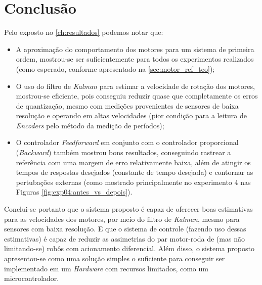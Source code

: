 \chapter[Conclusão]{Conclusão}
\label{ch:conclusao}


Pelo exposto no \autoref{ch:resultados} podemos notar que: 

\begin{itemize}
    \item A aproximação do comportamento dos motores para um sistema de primeira ordem, mostrou-se ser suficientemente para todos os experimentos realizados (como esperado, conforme apresentado na \autoref{sec:motor_ref_teo});
    \item O uso do filtro de \emph{Kalman} para estimar a velocidade de rotação dos motores, mostrou-se eficiente, pois conseguiu reduzir quase que completamente os erros de quantização, mesmo com medições provenientes de sensores de baixa resolução e operando em altas velocidades (pior condição para a leitura de \emph{Encoders} pelo método da medição de períodos);
    \item O controlador \emph{Feedforward} em conjunto com o controlador proporcional (\emph{Backward}) também mostrou bons resultados, conseguindo rastrear a referência com uma margem de erro relativamente baixa, além de atingir os tempos de respostas desejados (constante de tempo desejada) e contornar as pertubações externas (como mostrado principalmente no experimento 4 nas Figuras \ref{fig:exp04:antes_vs_depois}).\\
\end{itemize}


Conclui-se portanto que o sistema proposto é capaz de oferecer boas estimativas para as velocidades dos motores, por meio do filtro de \emph{Kalman}, mesmo para sensores com baixa resolução. E que o sistema de controle (fazendo uso dessas estimativas) é capaz de reduzir as assimetrias do par motor-roda de (mas não limitando-se) robôs com acionamento diferencial. Além disso, o sistema proposto apresentou-se como uma solução simples o suficiente para conseguir ser implementado em um \emph{Hardware} com recursos limitados, como um  microcontrolador.\\

